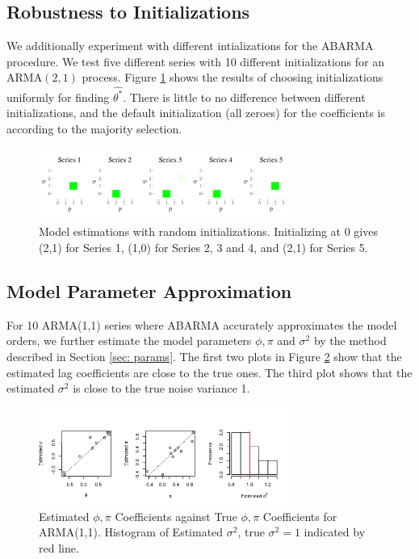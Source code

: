 \subsection{Robustness to Initializations}
We additionally experiment with different intializations for the ABARMA procedure.  We test five different series with 10 different initializations for an ARMA$(2,1)$ process.  Figure \ref{init21} shows the results of choosing initializations uniformly for finding $\hat{\theta^*}$.  There is little to no difference between different initializations, and the default initialization (all zeroes) for the coefficients is according to the majority selection. 
\begin{figure}
    \centering
    \includegraphics[width=3.25in]{init21.png}
    \caption{Model estimations with random initializations. Initializing at 0 gives (2,1) for Series 1, (1,0) for Series 2, 3 and 4, and (2,1) for Series 5. }
    \label{init21}
\end{figure}

\subsection{Model Parameter Approximation}

For 10 ARMA(1,1) series where ABARMA accurately approximates the model orders, we further estimate the model parameters $\phi,\pi$ and $\sigma^2$ by the method described in Section \ref{sec: params}. The first two plots in Figure \ref{paramplot} show that the estimated lag coefficients are close to the true ones. The third plot shows that the estimated $\sigma^2$ is close to the true noise variance 1. 

\begin{figure}
    \centering
    \includegraphics[width=3.25in]{paramplot.png}
    \caption{Estimated $\phi,\pi$ Coefficients against True $\phi,\pi$ Coefficients for ARMA(1,1). Histogram of Estimated $\sigma^2$, true $\sigma^2=1$ indicated by red line.}
    \label{paramplot}
\end{figure}

